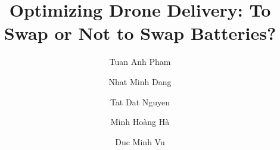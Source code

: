 \documentclass[3p, authoryear, 11pt]{elsarticle}
\title{Optimizing Drone Delivery: To Swap or Not to Swap Batteries?}
\author[add3]{Tuan Anh Pham}
\author[add3]{Nhat Minh Dang}
\author[add3]{Tat Dat Nguyen}
\author[add2]{Minh Ho{\`a}ng H{\`a}\corref{cor1}}
\author[add3]{Duc Minh Vu}
\begin{document}
 \begin{abstract}


\end{abstract}
\end{document}
